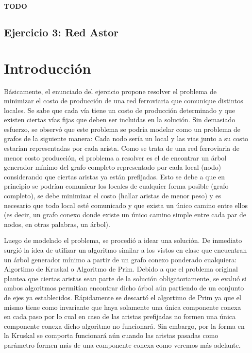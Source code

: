 \documentclass[a4paper,11pt] {article}
\begin{document}
\textbf{TODO}

\begin{center}
\section*{Ejercicio 3: Red Astor}
\end{center}

\bigskip
\section*{Introducci\'on}

Básicamente, el enunciado del ejercicio propone resolver el problema de minimizar el costo de producción de una red ferroviaria que comunique distintos locales. Se sabe que cada vía tiene un costo de producción determinado y que existen ciertas vías fijas que deben ser incluidas en la solución. Sin demasiado esfuerzo, se observó que este problema se podría modelar como un problema de grafos de la siguiente manera: Cada nodo sería un local y las vias junto a su costo estarían representadas por cada arista. Como se trata de una red ferroviaria de menor costo producción, el problema a resolver es el de encontrar un árbol generador mínimo del grafo completo representado por cada local (nodo) considerando que ciertas aristas ya están prefijadas. Esto se debe a que en principio se podrían comunicar los locales de cualquier forma posible (grafo completo), se debe minimizar el costo (hallar aristas de menor peso) y es necesario que todo local esté comunicado y que exista un único camino entre ellos (es decir, un grafo conexo donde existe un único camino simple entre cada par de nodos, en otras palabras, un árbol).

Luego de modelado el problema, se procedió a idear una solución. De inmediato surgió la idea de utilizar un algoritmo similar a los vistos en clase que encuentran un árbol generador mínimo a partir de un grafo conexo ponderado cualquiera: Algortimo de Kruskal o Algoritmo de Prim. Debido a que el problema original plantea que ciertas aristas sean parte de la solución obligatoriamente, se evaluó si ambos algoritmos permitían encontrar dicho árbol aún partiendo de un conjunto de ejes ya establecidos. Rápidamente se descartó el algortimo de Prim ya que el mismo tiene como invariante que haya solamente una única componente conexa en cada paso por lo cual en caso de las aristas prefijadas no formen una única componente conexa dicho algoritmo no funcionará. Sin embargo, por la forma en la Kruskal se comporta funcionará aún cuando las aristas pasadas como parámetro formen más de una componente conexa como veremos más adelante.
\end{document}
